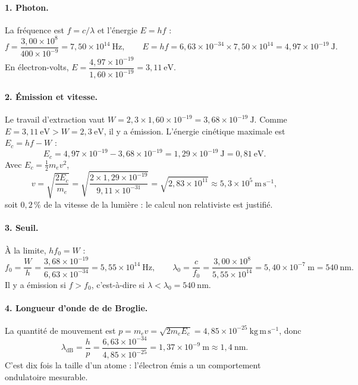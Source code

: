 \begin{correction}
\paragraph{1. Photon.} La fréquence est $f=c/\lambda$ et l'énergie $E=hf$ :
\[
  f=\frac{3{,}00\times10^{8}}{400\times10^{-9}}=7{,}50\times10^{14}\ \mathrm{Hz},
  \qquad
  E=hf=6{,}63\times10^{-34}\times7{,}50\times10^{14}=4{,}97\times10^{-19}\ \mathrm{J}.
\]
En électron-volts, $E=\dfrac{4{,}97\times10^{-19}}{1{,}60\times10^{-19}}=3{,}11\ \mathrm{eV}$.

\paragraph{2. Émission et vitesse.} Le travail d'extraction vaut
$W=2{,}3\times1{,}60\times10^{-19}=3{,}68\times10^{-19}\ \mathrm{J}$. Comme $E=3{,}11\ \mathrm{eV}>W=2{,}3\ \mathrm{eV}$,
il y a émission. L'énergie cinétique maximale est $E_c=hf-W$ :
\[
  E_c=4{,}97\times10^{-19}-3{,}68\times10^{-19}=1{,}29\times10^{-19}\ \mathrm{J}=0{,}81\ \mathrm{eV}.
\]
Avec $E_c=\tfrac12m_ev^2$,
\[
  v=\sqrt{\frac{2E_c}{m_e}}=\sqrt{\frac{2\times1{,}29\times10^{-19}}{9{,}11\times10^{-31}}}
  =\sqrt{2{,}83\times10^{11}}\approx5{,}3\times10^{5}\ \mathrm{m\,s^{-1}},
\]
soit $0{,}2\,\%$ de la vitesse de la lumière : le calcul non relativiste est justifié.

\paragraph{3. Seuil.} À la limite, $hf_0=W$ :
\[
  f_0=\frac{W}{h}=\frac{3{,}68\times10^{-19}}{6{,}63\times10^{-34}}=5{,}55\times10^{14}\ \mathrm{Hz},
  \qquad
  \lambda_0=\frac{c}{f_0}=\frac{3{,}00\times10^{8}}{5{,}55\times10^{14}}=5{,}40\times10^{-7}\ \mathrm{m}=540\ \mathrm{nm}.
\]
Il y a émission si $f>f_0$, c'est-à-dire si $\lambda<\lambda_0=540\ \mathrm{nm}$.

\paragraph{4. Longueur d'onde de de Broglie.} La quantité de mouvement est
$p=m_ev=\sqrt{2m_eE_c}=4{,}85\times10^{-25}\ \mathrm{kg\,m\,s^{-1}}$, donc
\[
  \lambda_{\mathrm{dB}}=\frac{h}{p}=\frac{6{,}63\times10^{-34}}{4{,}85\times10^{-25}}
  =1{,}37\times10^{-9}\ \mathrm{m}\approx1{,}4\ \mathrm{nm}.
\]
C'est dix fois la taille d'un atome : l'électron émis a un comportement ondulatoire mesurable.


\end{correction}
